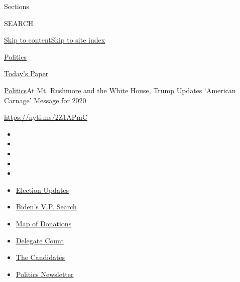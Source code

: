 Sections

SEARCH

\protect\hyperlink{site-content}{Skip to
content}\protect\hyperlink{site-index}{Skip to site index}

\href{https://www.nytimes.com/section/politics}{Politics}

\href{https://myaccount.nytimes.com/auth/login?response_type=cookie\&client_id=vi}{}

\href{https://www.nytimes.com/section/todayspaper}{Today's Paper}

\href{/section/politics}{Politics}\textbar{}At Mt. Rushmore and the
White House, Trump Updates `American Carnage' Message for 2020

\url{https://nyti.ms/2Z1APmC}

\begin{itemize}
\item
\item
\item
\item
\item
\end{itemize}

\begin{itemize}
\item
  \href{https://www.nytimes.com/2020/07/31/us/elections/biden-vs-trump.html?action=click\&pgtype=Article\&state=default\&region=TOP_BANNER\&context=storylines_menu}{Election
  Updates}
\item
  \href{https://www.nytimes.com/article/biden-vice-president-2020.html?action=click\&pgtype=Article\&state=default\&region=TOP_BANNER\&context=storylines_menu}{Biden's
  V.P. Search}
\item
  \href{https://www.nytimes.com/interactive/2020/07/24/us/politics/trump-biden-campaign-donors.html?action=click\&pgtype=Article\&state=default\&region=TOP_BANNER\&context=storylines_menu}{Map
  of Donations}
\item
  \href{https://www.nytimes.com/interactive/2020/us/elections/delegate-count-primary-results.html?action=click\&pgtype=Article\&state=default\&region=TOP_BANNER\&context=storylines_menu}{Delegate
  Count}
\item
  \href{https://www.nytimes.com/interactive/2019/us/politics/2020-presidential-candidates.html?action=click\&pgtype=Article\&state=default\&region=TOP_BANNER\&context=storylines_menu}{The
  Candidates}
\item
  \href{https://www.nytimes.com/newsletters/politics?action=click\&pgtype=Article\&state=default\&region=TOP_BANNER\&context=storylines_menu}{Politics
  Newsletter}
\end{itemize}

